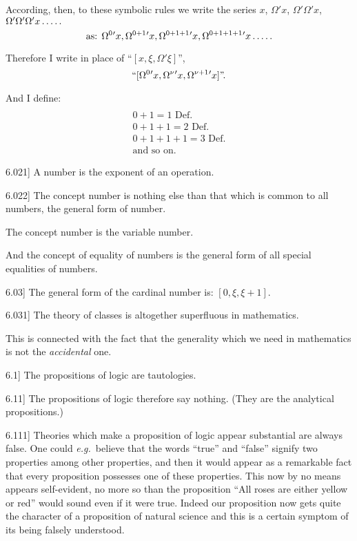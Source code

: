 \documentclass[12pt,oneside]{book}[2007/10/19]
\newcommand{\PropositionE}[2]{%
  \item[\phantomsection\label{PropE:#1}\PropGRef{#1}] #2%
}
\newcommand{\PropGRef}[1]{\hyperref[PropG:#1]{#1}}
\newcommand{\exempliGratia}{\textit{e.g.}}
\newcommand{\fivedots}{\mathinner{\ldotp\ldotp\ldotp\ldotp\ldotp}}
\begin{document}
\begin{propositions}
According, then, to these symbolic rules we
write the series $x$, $\Omega'x$, $\Omega'\Omega'x$, $\Omega'\Omega'\Omega'x\fivedots$
\[
\text{as: } \Omega^{0}{}'x, \Omega^{0+1}{}'x, \Omega^{0+1+1}{}'x, \Omega^{0+1+1+1}{}'x\fivedots
\]

Therefore I write in place of ``$[x, \xi, \Omega'\xi]$'',
\[
``[\Omega^{0}{}'x, \Omega^{\nu}{}'x, \Omega^{\nu+1}{}'x]\text{''.}
\]

And I define:
\[
\begin{array}{l}\\
0 + 1 = 1\text{ Def.}\\
0 + 1 + 1 = 2\text{ Def.}\\
0 + 1 + 1 + 1 = 3\text{ Def.}\\
\text{and so on.}
\end{array}
\]

\PropositionE{6.021}
{A number is the exponent of an operation.}


\PropositionE{6.022}
{The concept number is nothing else than that
which is common to all numbers, the general form
of number.

The concept number is the variable number.

And the concept of equality of numbers is the
general form of all special equalities of numbers.}


\PropositionE{6.03}
{The general form of the cardinal number is:
$[0, \xi, \xi + 1]$.}


\PropositionE{6.031}
{The theory of classes is altogether superfluous
in mathematics.

This is connected with the fact that the generality
which we need in mathematics is not the
\emph{accidental} one.}


\PropositionE{6.1}
{The propositions of logic are tautologies.}


\PropositionE{6.11}
{The propositions of logic therefore say nothing.
(They are the analytical propositions.)}


\PropositionE{6.111}
{Theories which make a proposition of logic
appear substantial are always false. One could
\exempliGratia\ believe that the words ``true'' and ``false''
signify two properties among other properties,
and then it would appear as a remarkable fact
that every proposition possesses one of these
properties. This now by no means appears self-evident,
no more so than the proposition ``All
roses are either yellow or red'' would sound even
if it were true. Indeed our proposition now gets
quite the character of a proposition of natural
science and this is a certain symptom of its being
falsely understood.}



\end{propositions}
\end{document}
